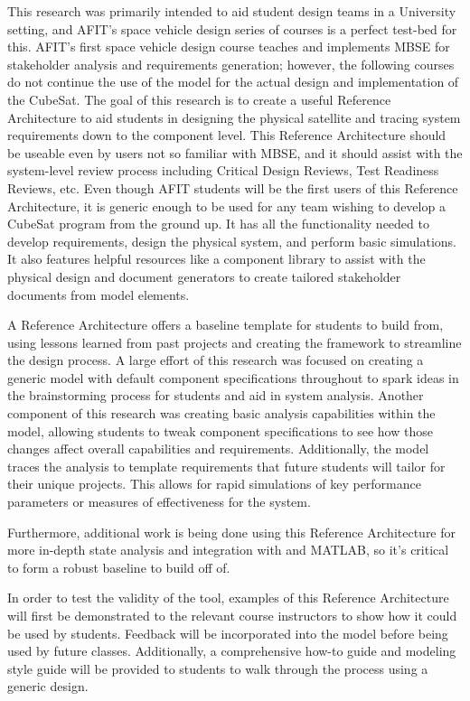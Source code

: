 This research was primarily intended to aid student design teams in a University setting, and AFIT's space vehicle design series of courses is a perfect test-bed for this. AFIT's first space vehicle design course teaches and implements MBSE for stakeholder analysis and requirements generation; however, the following courses do not continue the use of the model for the actual design and implementation of the CubeSat. The goal of this research is to create a useful Reference Architecture to aid students in designing the physical satellite and tracing system requirements down to the component level. This Reference Architecture should be useable even by users not so familiar with MBSE, and it should assist with the system-level review process including Critical Design Reviews, Test Readiness Reviews, etc. Even though AFIT students will be the first users of this Reference Architecture, it is generic enough to be used for any team wishing to develop a CubeSat program from the ground up. It has all the functionality needed to develop requirements, design the physical system, and perform basic simulations. It also features helpful resources like a component library to assist with the physical design and document generators to create tailored stakeholder documents from model elements. 

A Reference Architecture offers a baseline template for students to build from, using lessons learned from past projects and creating the framework to streamline the design process. A large effort of this research was focused on creating a generic model with default component specifications throughout to spark ideas in the brainstorming process for students and aid in system analysis. Another component of this research was creating basic analysis capabilities within the model, allowing students to tweak component specifications to see how those changes affect overall capabilities and requirements. Additionally, the model traces the analysis to template requirements that future students will tailor for their unique projects. This allows for rapid simulations of key performance parameters or measures of effectiveness for the system. 

Furthermore, additional work is being done using this Reference Architecture for more in-depth state analysis and integration with  and MATLAB, so it's critical to form a robust baseline to build off of.

In order to test the validity of the tool, examples of this Reference Architecture will first be demonstrated to the relevant course instructors to show how it could be used by students. Feedback will be incorporated into the model before being used by future classes. Additionally, a comprehensive how-to guide and modeling style guide will be provided to students to walk through the process using a generic design. 
